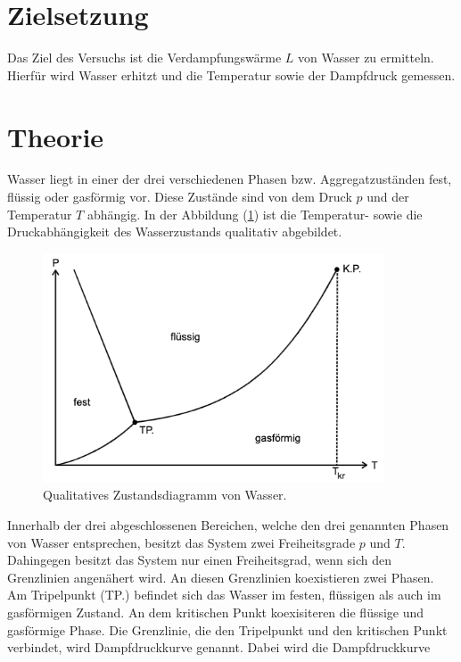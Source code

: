 \section{Zielsetzung}
\label{sec:Zielsetzung}
\nocite{anleitungV203}
Das Ziel des Versuchs ist die Verdampfungswärme $L$ von Wasser zu ermitteln. Hierfür wird Wasser erhitzt und
die Temperatur sowie der Dampfdruck gemessen.

\section{Theorie}
\label{sec:Theorie}
Wasser liegt in einer der drei verschiedenen Phasen bzw. Aggregatzuständen fest, flüssig oder gasförmig vor.
Diese Zustände sind von dem Druck $p$ und der Temperatur $T$ abhängig. In der Abbildung (\ref{fig:ZustandsdiagrammWasser})
ist die Temperatur- sowie die Druckabhängigkeit des Wasserzustands qualitativ abgebildet.
\begin{figure}[H]
    \centering
    \includegraphics[width=0.90\textwidth]{ZustandsdiagrammWasser.png}
    \caption{Qualitatives Zustandsdiagramm von Wasser. \cite{anleitungV203}}
    \label{fig:ZustandsdiagrammWasser}
\end{figure}
Innerhalb der drei abgeschlossenen Bereichen, welche den drei genannten Phasen von Wasser entsprechen, besitzt das System 
zwei Freiheitsgrade $p$ und $T$. Dahingegen besitzt das System nur einen Freiheitsgrad, wenn sich den Grenzlinien angenähert wird. An diesen
Grenzlinien koexistieren zwei Phasen. Am Tripelpunkt (TP.) befindet sich das Wasser im festen, flüssigen als auch im gasförmigen Zustand.
An dem kritischen Punkt koexisiteren die flüssige und gasförmige Phase. 
Die Grenzlinie, die den Tripelpunkt und den kritischen Punkt verbindet, wird Dampfdruckkurve genannt. Dabei wird die Dampfdruckkurve
